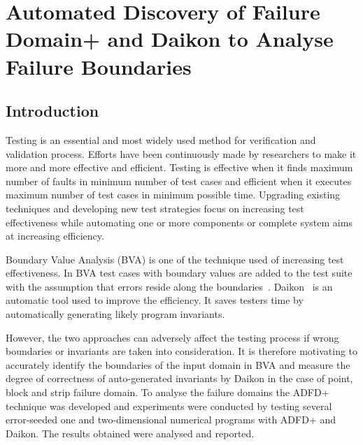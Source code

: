 \chapter{Automated Discovery of Failure Domain+ and Daikon to Analyse Failure Boundaries}
\label{chap:ADFD+}



\section{Introduction}\label{sec:intro6}
Testing is an essential and most widely used method for verification and validation process. Efforts have been continuously made by researchers to make it more and more effective and efficient. Testing is effective when it finds maximum number of faults in minimum number of test cases and efficient when it executes maximum number of test cases in minimum possible time. Upgrading existing techniques and developing new test strategies focus on increasing test effectiveness while automating one or more components or complete system aims at increasing efficiency.

Boundary Value Analysis (BVA) is one of the technique used of increasing test effectiveness. In BVA test cases with boundary values are added to the test suite with the assumption that errors reside along the boundaries~\cite{radatz1990ieee}. Daikon~\cite{ernst2007daikon} is an automatic tool used to improve the efficiency. It saves testers time by automatically generating likely program invariants.

However, the two approaches can adversely affect the testing process if wrong boundaries or invariants are taken into consideration. It is therefore motivating to accurately identify the boundaries of the input domain in BVA and measure the degree of correctness of auto-generated invariants by Daikon in the case of point, block and strip failure domain. To analyse the failure domains the ADFD+ technique was developed and experiments were conducted by testing several error-seeded one and two-dimensional numerical programs with ADFD+ and Daikon. The results obtained were analysed and reported.  


